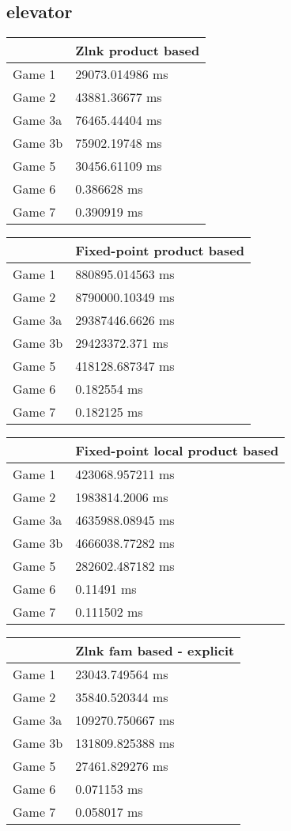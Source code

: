 \subsection{elevator}
\begin{tabular}{|l|l|}
	\hline
	& Zlnk product based \\ \hline
	Game 1 & 29073.014986 ms \\ \hline
	Game 2 & 43881.36677 ms \\ \hline
	Game 3a & 76465.44404 ms \\ \hline
	Game 3b & 75902.19748 ms \\ \hline
	Game 5 & 30456.61109 ms \\ \hline
	Game 6 & 0.386628 ms \\ \hline
	Game 7 & 0.390919 ms \\ \hline
\end{tabular}
\begin{tabular}{|l|l|}
	\hline
	& Fixed-point product based \\ \hline
	Game 1 & 880895.014563 ms \\ \hline
	Game 2 & 8790000.10349 ms \\ \hline
	Game 3a & 29387446.6626 ms \\ \hline
	Game 3b & 29423372.371 ms \\ \hline
	Game 5 & 418128.687347 ms \\ \hline
	Game 6 & 0.182554 ms \\ \hline
	Game 7 & 0.182125 ms \\ \hline
\end{tabular}
\begin{tabular}{|l|l|}
	\hline
	& Fixed-point local product based \\ \hline
	Game 1 & 423068.957211 ms \\ \hline
	Game 2 & 1983814.2006 ms \\ \hline
	Game 3a & 4635988.08945 ms \\ \hline
	Game 3b & 4666038.77282 ms \\ \hline
	Game 5 & 282602.487182 ms \\ \hline
	Game 6 & 0.11491 ms \\ \hline
	Game 7 & 0.111502 ms \\ \hline
\end{tabular}
\begin{tabular}{|l|l|}
	\hline
	& Zlnk fam based - explicit \\ \hline
	Game 1 & 23043.749564 ms \\ \hline
	Game 2 & 35840.520344 ms \\ \hline
	Game 3a & 109270.750667 ms \\ \hline
	Game 3b & 131809.825388 ms \\ \hline
	Game 5 & 27461.829276 ms \\ \hline
	Game 6 & 0.071153 ms \\ \hline
	Game 7 & 0.058017 ms \\ \hline
\end{tabular}
